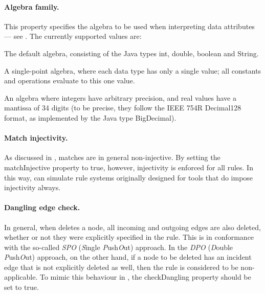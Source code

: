 \paragraph{Algebra family.}

This property specifies the algebra to be used when interpreting data
attributes --- see . The currently supported values are:
%
\begin{description}\noitemsep
\item[\textsf{default}] The default algebra, consisting of the Java types
  \textsf{int}, \textsf{double}, \textsf{boolean} and \textsf{String}.
\item[\textsf{point}] A single-point algebra, where each data type has only a
  single value; all constants and operations evaluate to this one value.
\item[\textsf{big}] An algebra where integers have arbitrary precision, and
  real values have a mantissa of 34 digits (to be precise, they follow the
  IEEE 754R Decimal128 format, as implemented by the Java type
  \textsf{BigDecimal}).
\end{description}

\paragraph{Match injectivity.}

As discussed in , matches are in general non-injective. By
setting the \textsf{matchInjective} property to \textsf{true}, however,
injectivity is enforced for all rules. In this way, \GROOVE{} can simulate rule
systems originally designed for tools that do impose injectivity always.

\paragraph{Dangling edge check.}

In general, when \GROOVE{} deletes a node, all incoming and outgoing edges are
also deleted, whether or not they were explicitly specified in the rule. This
is in conformance with the so-called \emph{SPO} (\emph{S}ingle
\emph{P}ush\emph{O}ut) approach. In the \emph{DPO} (\emph{D}ouble
\emph{P}ush\emph{O}ut) approach, on the other hand, if a node to be deleted has
an incident edge that is not explicitly deleted as well, then the rule is
considered to be non-applicable. To mimic this behaviour in \GROOVE, the
\textsf{checkDangling} property should be set to \textsf{true}.

